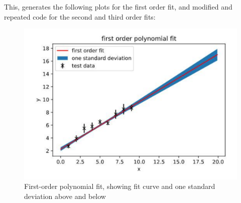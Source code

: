 \documentclass[a4paper]{article}
\begin{document}
This, generates the following plots for the first order fit, and modified and repeated code for the second and third order fits:
\begin{figure}[h]
\centerline{\includegraphics[scale=0.3]{first_order.pdf}}
\caption{First-order polynomial fit, showing fit curve and one standard deviation above and below}
\label{fig:firstorder}
\end{figure}
\end{document}
